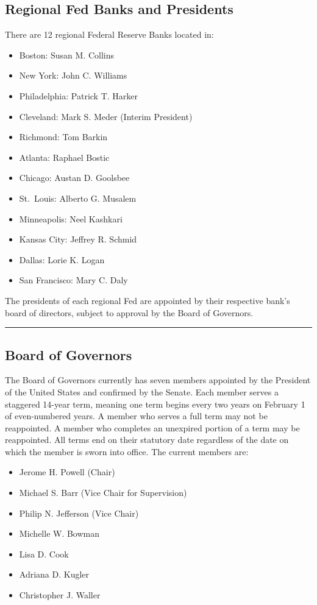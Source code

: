 \documentclass{article}
\begin{document}
\subsection{Regional Fed Banks and Presidents}
There are 12 regional Federal Reserve Banks located in:
\begin{itemize}
    \item Boston: Susan M. Collins
    \item New York: John C. Williams
    \item Philadelphia: Patrick T. Harker
    \item Cleveland: Mark S. Meder (Interim President)
    \item Richmond: Tom Barkin
    \item Atlanta: Raphael Bostic
    \item Chicago: Austan D. Goolsbee
    \item St.\ Louis: Alberto G. Musalem
    \item Minneapolis: Neel Kashkari
    \item Kansas City: Jeffrey R. Schmid
    \item Dallas: Lorie K. Logan
    \item San Francisco: Mary C. Daly
\end{itemize}
The presidents of each regional Fed are appointed by their respective bank's board of directors, subject to approval by the Board of Governors.

\noindent\rule{\linewidth}{0.5pt}

\subsection{Board of Governors}
The Board of Governors currently has seven members appointed by the President of the United States and confirmed by the Senate. Each member serves a staggered 14-year term, meaning one term begins every two years on February 1 of even-numbered years. A member who serves a full term may not be reappointed. A member who completes an unexpired portion of a term may be reappointed. All terms end on their statutory date regardless of the date on which the member is sworn into office. The current members are:
\begin{itemize}
    \item Jerome H. Powell (Chair)
    \item Michael S. Barr (Vice Chair for Supervision)
    \item Philip N. Jefferson (Vice Chair)
    \item Michelle W. Bowman
    \item Lisa D. Cook
    \item Adriana D. Kugler
    \item Christopher J. Waller
\end{itemize}
\end{document}
